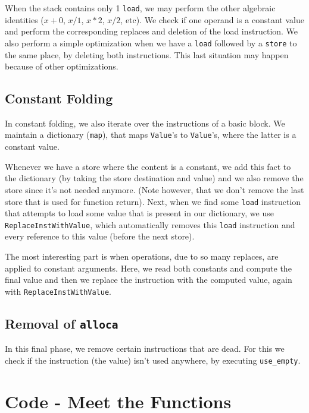 When the stack contains only 1 \texttt{load}, we may perform the other algebraic identities ($x + 0$, $x / 1$, $x * 2$, $x / 2$, etc). We check if one operand is a constant value and perform
the corresponding replaces and deletion of the load instruction. We also perform a simple optimization when we have a \texttt{load} followed by a \texttt{store} to the same place,
    by deleting both instructions. This last situation may happen because of other optimizations.

\subsection{Constant Folding}

In constant folding, we also iterate over the instructions of a basic block. We maintain a dictionary (\texttt{map}), that maps \texttt{Value}'s to \texttt{Value}'s, where the latter is a constant value.

Whenever we have a store where the content is a constant, we add this fact to the dictionary (by taking the store destination and value) and we also remove the store since it's not needed anymore. (Note however, that we don't remove the last store that is used for function return). Next, when we find some \texttt{load} instruction that attempts to load some value that is present in our dictionary, we use
\texttt{ReplaceInstWithValue}, which automatically removes this \texttt{load} instruction and every reference to this value (before the next store).

The most interesting part is when operations, due to so many replaces, are applied to constant arguments. Here, we read both constants and compute the final value and then we replace the instruction with the computed value, again with \texttt{ReplaceInstWithValue}.

\subsection{Removal of \texttt{alloca}}

In this final phase, we remove certain instructions that are dead. For this we check if the instruction (the value) isn't used anywhere, by executing \texttt{use\_empty}.

\section{Code - Meet the Functions}

{\tiny }

